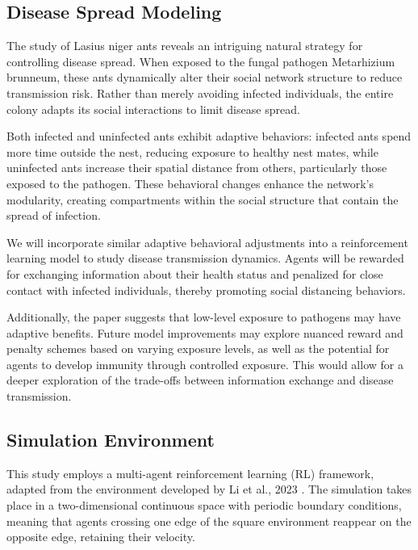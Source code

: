 \documentclass[9pt]{IEEEtran}
\begin{document}
\subsection{Disease Spread Modeling}

The study of Lasius niger ants \cite{Stroeymeyt2018} reveals an intriguing natural strategy for controlling disease spread. When exposed to the fungal pathogen Metarhizium brunneum, these ants dynamically alter their social network structure to reduce transmission risk. Rather than merely avoiding infected individuals, the entire colony adapts its social interactions to limit disease spread.

Both infected and uninfected ants exhibit adaptive behaviors: infected ants spend more time outside the nest, reducing exposure to healthy nest mates, while uninfected ants increase their spatial distance from others, particularly those exposed to the pathogen. These behavioral changes enhance the network’s modularity, creating compartments within the social structure that contain the spread of infection.

We will incorporate similar adaptive behavioral adjustments into a reinforcement learning model to study disease transmission dynamics. Agents will be rewarded for exchanging information about their health status and penalized for close contact with infected individuals, thereby promoting social distancing behaviors.

Additionally, the paper suggests that low-level exposure to pathogens may have adaptive benefits. Future model improvements may explore nuanced reward and penalty schemes based on varying exposure levels, as well as the potential for agents to develop immunity through controlled exposure. This would allow for a deeper exploration of the trade-offs between information exchange and disease transmission.

\subsection{Simulation Environment}

This study employs a multi-agent reinforcement learning (RL) framework, adapted from the environment developed by Li et al., 2023 \cite{li2023predator}. The simulation takes place in a two-dimensional continuous space with periodic boundary conditions, meaning that agents crossing one edge of the square environment reappear on the opposite edge, retaining their velocity.
\end{document}
